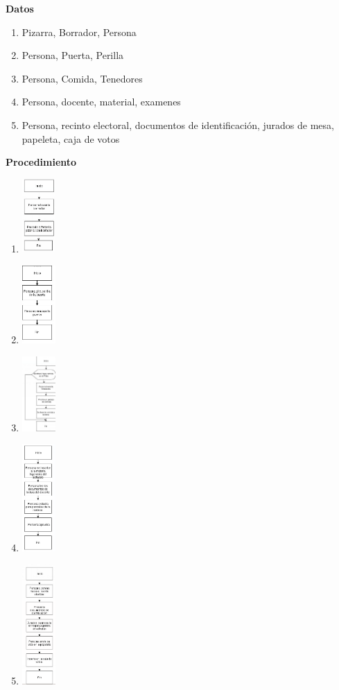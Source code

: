 \textbf{Datos}
\begin{enumerate}
\item  Pizarra, Borrador, Persona
\item  Persona, Puerta, Perilla
\item  Persona, Comida, Tenedores
\item  Persona, docente, material, examenes
\item  Persona, recinto electoral, documentos de identificación, jurados de mesa, papeleta, caja de votos
\end{enumerate}
\textbf{Procedimiento}
\begin{enumerate}
\item \includegraphics[width=0.1\textwidth]{img/1-a.png}
\item \includegraphics[width=0.1\textwidth]{img/1-b.png}
\item \includegraphics[width=0.1\textwidth]{img/1-c.png}
\item \includegraphics[width=0.1\textwidth]{img/1-d.png}
\item \includegraphics[width=0.1\textwidth]{img/1-e.png}
\end{enumerate}
  
